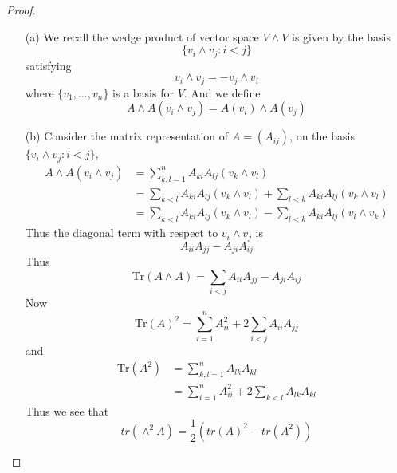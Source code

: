 \begin{proof}
    \begin{itemize}
        \item[(a)] We recall the wedge product of vector space $V\wedge V$ is given by the basis 
        \begin{equation*}
            \{v_i\wedge v_j: i<j\}
        \end{equation*}
        satisfying 
        \begin{equation*}
            v_i\wedge v_j=-v_j\wedge v_i
        \end{equation*}
        where $\{v_1,\dots, v_n\}$ is a basis for $V$. And we define 
        \begin{equation*}
            A\wedge A(v_i\wedge v_j)=A(v_i)\wedge A(v_j)
        \end{equation*}
        \item[(b)] Consider the matrix representation of $A=(A_{ij})$, on the basis $\{v_i\wedge v_j: i<j\}$, 
        \begin{align*}
            A\wedge A(v_i\wedge v_j)&=\sum_{k,l=1}^nA_{ki}A_{lj}(v_k\wedge v_l)\\
            &=\sum_{k<l}A_{ki}A_{lj}(v_k\wedge v_l)+\sum_{l<k}A_{ki}A_{lj}(v_k\wedge v_l)\\
            &=\sum_{k<l}A_{ki}A_{lj}(v_k\wedge v_l)-\sum_{l<k}A_{ki}A_{lj}(v_l\wedge v_k)
        \end{align*}
        Thus the diagonal term with respect to $v_i\wedge v_j$ is 
        \begin{equation*}
            A_{ii}A_{jj}-A_{ji}A_{ij}
        \end{equation*}
        Thus 
        \begin{equation*}
            \text{Tr}(A\wedge A)=\sum_{i<j}A_{ii}A_{jj}-A_{ji}A_{ij}
        \end{equation*}
        Now 
        \begin{equation*}
            \text{Tr}(A)^2=\sum_{i=1}^nA_{ii}^2+2\sum_{i<j}A_{ii}A_{jj}
        \end{equation*}
        and 
        \begin{align*}
            \text{Tr}(A^2)&=\sum_{k,l=1}^nA_{lk}A_{kl}\\
            &=\sum_{i=1}^nA_{ii}^2+2\sum_{k<l}A_{lk}A_{kl}
        \end{align*}
        Thus we see that 
        \[tr(\wedge^{2}A)=\frac{1}{2}(tr(A)^{2}-tr(A^{2}))\]
    \end{itemize}
\end{proof}


